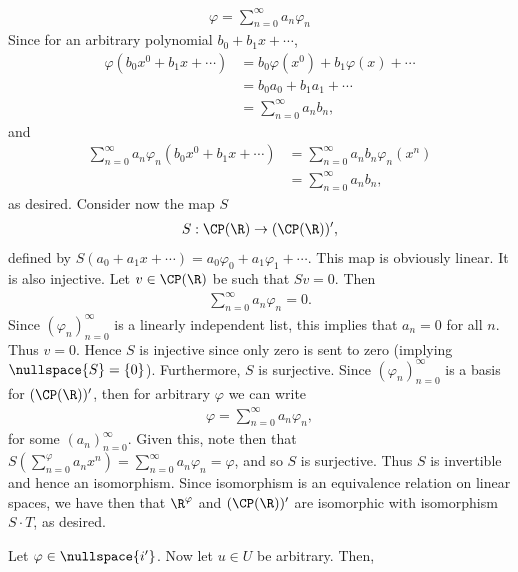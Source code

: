 \documentclass{book}
\begin{document}
\begin{enumerate}[label=\arabic*)]
    \begin{align*}
      \varphi = \sum_{n = 0}^{\infty}a_n\varphi_n
    \end{align*}
    Since for an arbitrary polynomial $b_0 + b_1x + \cdots$,
    \begin{align*}
      \varphi(b_0x^0 + b_1x + \cdots) & = b_0\varphi(x^0) + b_1\varphi(x) + \cdots \\
      & = b_0a_0 + b_1a_1 + \cdots \\
      & = \sum_{n = 0}^{\infty}a_nb_n,
    \end{align*}
    and
    \begin{align*}
      \sum_{n = 0}^{\infty}a_n\varphi_n(b_0x^0 + b_1x + \cdots) & = \sum_{n = 0}^{\infty}a_nb_n\varphi_n(x^n) \\
      & = \sum_{n = 0}^{\infty}a_nb_n,
    \end{align*}
    as desired. Consider now the map $S$
    \begin{align*}
      S: \CP(\R) \to (\CP(\R))^{\prime},
    \end{align*}
    defined by $S(a_0 + a_1x + \cdots) = a_0\varphi_0 + a_1\varphi_1 + \cdots$. This map is obviously linear. It is also injective. Let $v \in \CP(\R)$ be such that $Sv = 0$. Then 
    \begin{align*}
      \sum_{n = 0}^{\infty}a_n\varphi_n = 0.
    \end{align*}
    Since $(\varphi_n)_{n = 0}^{\infty}$ is a linearly independent list, this implies that $a_n = 0$ for all $n$. Thus $v = 0$. Hence $S$ is injective since only zero is sent to zero
    (implying $\nullspace{S} = \{0\}$). Furthermore, $S$ is surjective. Since $(\varphi_n)_{n = 0}^{\infty}$ is a basis for $(\CP(\R))^{\prime}$, then for arbitrary $\varphi$ we can write 
    \begin{align*}
      \varphi = \sum_{n = 0}^{\infty}a_n\varphi_n,
    \end{align*}
    for some $(a_n)_{n = 0}^\infty$. Given this, note then that $S(\sum_{n = 0}^{\varphi}a_nx^n) = \sum_{n = 0}^{\infty}a_n\varphi_n = \varphi$, and so $S$ is surjective. Thus $S$ is
    invertible and hence an isomorphism. Since isomorphism is an equivalence relation on linear spaces, we have then that $\R^\varphi$ and $(\CP(\R))^{\prime}$ are isomorphic with
    isomorphism $S \cdot T$, as desired.
    \ii
      \begin{enumerate}[label=\alph*)]
        \ii 
          Let $\varphi \in \nullspace{i^{\prime}}$. Now let $u \in U$ be arbitrary. Then,
          \begin{align*}

\end{align*}
\end{enumerate}
\end{enumerate}
\end{document}
